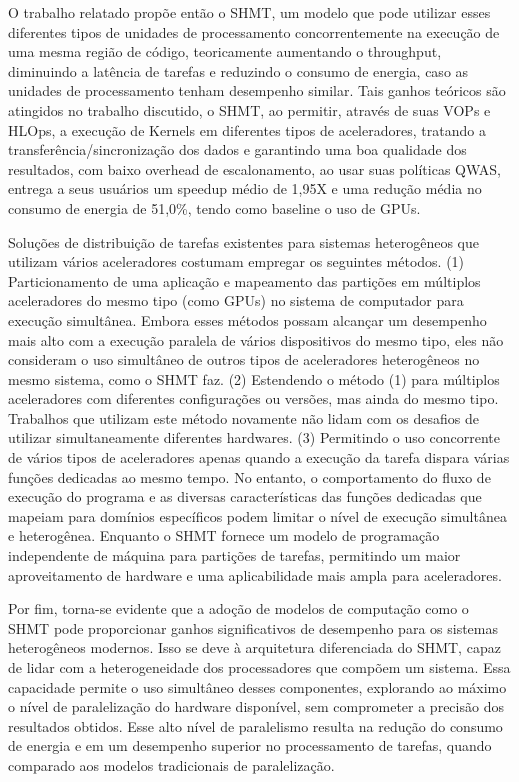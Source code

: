 \documentclass{article}
\begin{document}
O trabalho relatado propõe então o SHMT, um modelo que pode utilizar esses diferentes tipos de unidades de processamento concorrentemente na execução de uma mesma região de código, teoricamente aumentando o throughput, diminuindo a latência de tarefas e reduzindo o consumo de energia, caso as unidades de processamento tenham desempenho similar. Tais ganhos teóricos são atingidos no trabalho discutido, o SHMT, ao permitir, através de suas VOPs e HLOps, a execução de Kernels em diferentes tipos de aceleradores, tratando a transferência/sincronização dos dados e garantindo uma boa qualidade dos resultados, com baixo overhead de escalonamento, ao usar suas políticas QWAS, entrega a seus usuários um speedup médio de 1,95X e uma redução média no consumo de energia de 51,0\%, tendo como baseline o uso de GPUs.

Soluções de distribuição de tarefas existentes para sistemas heterogêneos que utilizam vários aceleradores costumam empregar os seguintes métodos. (1) Particionamento de uma aplicação e mapeamento das partições em múltiplos aceleradores do mesmo tipo (como GPUs) no sistema de computador para execução simultânea. Embora esses métodos possam alcançar um desempenho mais alto com a execução paralela de vários dispositivos do mesmo tipo, eles não consideram o uso simultâneo de outros tipos de aceleradores heterogêneos no mesmo sistema, como o SHMT faz. (2) Estendendo o método (1) para múltiplos aceleradores com diferentes configurações ou versões, mas ainda do mesmo tipo. Trabalhos que utilizam este método novamente não lidam com os desafios de utilizar simultaneamente diferentes hardwares. (3) Permitindo o uso concorrente de vários tipos de aceleradores apenas quando a execução da tarefa dispara várias funções dedicadas ao mesmo tempo. No entanto, o comportamento do fluxo de execução do programa e as diversas características das funções dedicadas que mapeiam para domínios específicos podem limitar o nível de execução simultânea e heterogênea. Enquanto o SHMT fornece um modelo de programação independente de máquina para partições de tarefas, permitindo um maior aproveitamento de hardware e uma aplicabilidade mais ampla para aceleradores.

Por fim, torna-se evidente que a adoção de modelos de computação como o SHMT pode proporcionar ganhos significativos de desempenho para os sistemas heterogêneos modernos. Isso se deve à arquitetura diferenciada do SHMT, capaz de lidar com a heterogeneidade dos processadores que compõem um sistema. Essa capacidade permite o uso simultâneo desses componentes, explorando ao máximo o nível de paralelização do hardware disponível, sem comprometer a precisão dos resultados obtidos. Esse alto nível de paralelismo resulta na redução do consumo de energia e em um desempenho superior no processamento de tarefas, quando comparado aos modelos tradicionais de paralelização.
\end{document}
